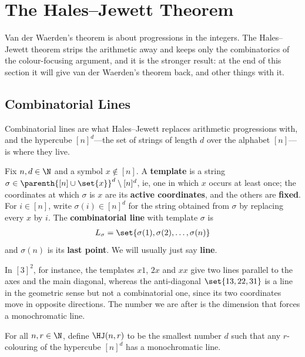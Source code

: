 \section{The Hales--Jewett Theorem}

Van der Waerden's theorem is about progressions in the integers. The Hales--Jewett theorem strips the arithmetic away and keeps only the combinatorics of the colour-focusing argument, and it is the stronger result: at the end of this section it will give van der Waerden's theorem back, and other things with it.

\subsection{Combinatorial Lines}

Combinatorial lines are what Hales--Jewett replaces arithmetic progressions with, and the hypercube $[n]^d$---the set of strings of length $d$ over the alphabet $[n]$---is where they live.

\begin{boxdefinition}
    Fix $n, d \in \N$ and a symbol $x \notin [n]$. A \textbf{template} is a string $\sigma \in \parenth{[n] \cup \set{x}}^d \setminus [n]^d$, ie, one in which $x$ occurs at least once; the coordinates at which $\sigma$ is $x$ are its \textbf{active coordinates}, and the others are \textbf{fixed}. For $i \in [n]$, write $\sigma(i) \in [n]^d$ for the string obtained from $\sigma$ by replacing every $x$ by $i$. The \textbf{combinatorial line} with template $\sigma$ is
    \begin{align*}
        L_\sigma = \set{\sigma(1), \sigma(2), \ldots, \sigma(n)}
    \end{align*}
    and $\sigma(n)$ is its \textbf{last point}. We will usually just say \textbf{line}.
\end{boxdefinition}

In $[3]^2$, for instance, the templates $x1$, $2x$ and $xx$ give two lines parallel to the axes and the main diagonal, whereas the anti-diagonal $\set{13, 22, 31}$ is a line in the geometric sense but not a combinatorial one, since its two coordinates move in opposite directions. The number we are after is the dimension that forces a monochromatic line.

\begin{boxdefinition}
    For all $n, r \in \N$, define $\HJ(n, r)$ to be the smallest number $d$ such that any $r$-colouring of the hypercube $[n]^d$ has a monochromatic line.
\end{boxdefinition}

